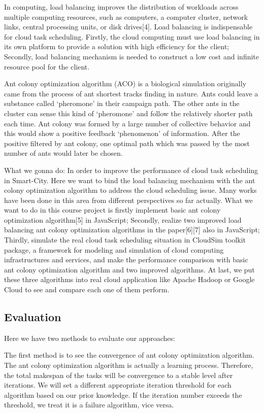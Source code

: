 \documentclass[conference]{IEEEtran}
\begin{document}
In computing, load balancing improves the distribution of workloads across multiple computing resources, such as computers, a computer cluster, network links, central processing units, or disk drives[4]. Load balancing is indispensable for cloud task scheduling. Firstly, the cloud computing must use load balancing in its own platform to provide a solution with high efficiency for the client; Secondly, load balancing mechanism is needed to construct a low cost and infinite resource pool for the client.

Ant colony optimization algorithm (ACO) is a biological simulation originally came from the process of ant shortest tracks finding in nature. Ants could leave a substance called ‘pheromone’ in their campaign path. The other ants in the cluster can sense this kind of ‘pheromone’ and follow the relatively shorter path each time. Ant colony was formed by a large number of collective behavior and this would show a positive feedback ‘phenomenon’ of information. After the positive filtered by ant colony, one optimal path which was passed by the most number of ants would later be chosen.

What we gonna do: 
In order to improve the performance of cloud task scheduling in Smart-City. Here we want to bind the load balancing mechanism with the ant colony optimization algorithm to address the cloud scheduling issue. Many works have been done in this area from different perspectives so far actually. What we want to do in this course project is firstly implement basic ant colony optimization algorithm[5] in JavaScript; Secondly, realize two improved load balancing ant colony optimization algorithms in the paper[6][7] also in JavaScript; Thirdly, simulate the real cloud task scheduling situation in CloudSim toolkit package, a framework for modeling and simulation of cloud computing infrastructures and services, and make the performance comparison with basic ant colony optimization algorithm and two improved algorithms. At last, we put these three algorithms into real cloud application like Apache Hadoop or Google Cloud to see and compare each one of them perform.
\subsection{Evaluation}
Here we have two methods to evaluate our approaches:

The first method is to see the convergence of ant colony optimization algorithm. The ant colony optimization algorithm is actually a learning process. Therefore, the total makespan of the tasks will be convergence to a stable level after iterations. We will set a different appropriate iteration threshold for each algorithm based on our prior knowledge. If the iteration number exceeds the threshold, we treat it is a failure algorithm, vice versa.
\end{document}
